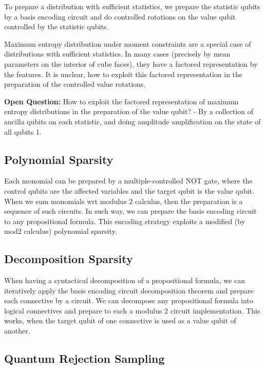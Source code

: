 \documentclass[aps,onecolumn,nofootinbib,pra]{article}
\begin{document}
    To prepare a distribution with sufficient statistics, we prepare the statistic qubits by a basis encoding circuit and do controlled rotations on the value qubit controlled by the statistic qubits.

    Maximum entropy distribution under moment constraints are a special case of distributions with sufficient statistics.
    In many cases (precisely by mean parameters on the interior of cube faces), they have a factored representation by the features.
    It is unclear, how to exploit this factored representation in the preparation of the controlled value rotations.

    \textbf{Open Question:} How to exploit the factored representation of maximum entropy distributions in the preparation of the value qubit?
    - By a collection of ancilla qubits on each statistic, and doing amplitude amplification on the state of all qubits 1.

    \subsection{Polynomial Sparsity}

    Each monomial can be prepared by a multiple-controlled NOT gate, where the control qubits are the affected variables and the target qubit is the value qubit.
    When we sum monomials wrt modulus 2 calculus, then the preparation is a sequence of such circuits.
    In such way, we can prepare the basis encoding circuit to any propositional formula.
    This encoding strategy exploits a modified (by mod2 calculus) polynomial sparsity.

    \subsection{Decomposition Sparsity}

    When having a syntactical decomposition of a propositional formula, we can iteratively apply the basis encoding circuit decomposition theorem and prepare each connective by a circuit.
    We can decompose any propositional formula into logical connectives and prepare to each a modulus 2 circuit implementation.
    This works, when the target qubit of one connective is used as a value qubit of another.

    \subsection{Quantum Rejection Sampling}
\end{document}

